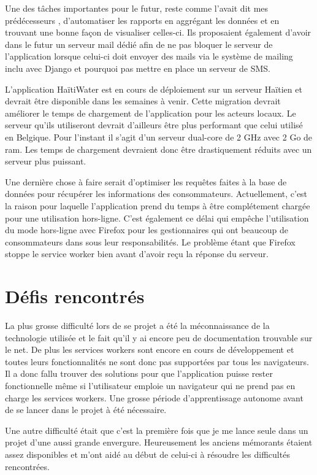 \documentclass{EPL-master-thesis-covers-FR}
\begin{document}
			Une des tâches importantes pour le futur, reste comme l'avait dit mes prédécesseurs \cite{ref:haitiwater}, d'automatiser les rapports en aggrégant les données et en trouvant une bonne façon de visualiser celles-ci. Ils proposaient également d'avoir dans le futur un serveur mail dédié afin de ne pas bloquer le serveur de l'application lorsque celui-ci doit envoyer des mails via le système de mailing inclu avec Django et pourquoi pas mettre en place un serveur de SMS.
			
			L'application HaïtiWater est en cours de déploiement sur un serveur Haïtien et devrait être disponible dans les semaines à venir. Cette migration devrait améliorer le temps de chargement de l'application pour les acteurs locaux. Le serveur qu'ils utiliseront devrait d'ailleurs être plus performant que celui utilisé en Belgique. Pour l'instant il s'agit d'un serveur dual-core de 2 GHz avec 2 Go de ram. Les temps de chargement devraient donc être drastiquement réduits avec un serveur plus puissant. 
			
			Une dernière chose à faire serait d'optimiser les requêtes faites à la base de données pour récupérer les informations des consommateurs. Actuellement, c'est la raison pour laquelle l'application prend du temps à être complétement chargée pour une utilisation hors-ligne. C'est également ce délai qui empêche l'utilisation du mode hors-ligne avec Firefox pour les gestionnaires qui ont beaucoup de consommateurs dans sous leur responsabilités. Le problème étant que Firefox stoppe le service worker bien avant d'avoir reçu la réponse du serveur.
			

		\section{Défis rencontrés}
			La plus grosse difficulté lors de se projet a été la méconnaissance de la technologie utilisée et le fait qu'il y ai encore peu de documentation trouvable sur le net. De plus les services workers sont encore en cours de développement et toutes leurs fonctionnalités ne sont donc pas supportées par tous les navigateurs. Il a donc fallu trouver des solutions pour que l'application puisse rester fonctionnelle même si l'utilisateur emploie un navigateur qui ne prend pas en charge les services workers. Une grosse période d'apprentissage autonome avant de se lancer dans le projet à été nécessaire.
			
			Une autre difficulté était que c'est la première fois que je me lance seule dans un projet d'une aussi grande envergure. Heureusement les anciens mémorants étaient assez disponibles et m'ont aidé au début de celui-ci à résoudre les difficultés rencontrées.
			
\end{document}
